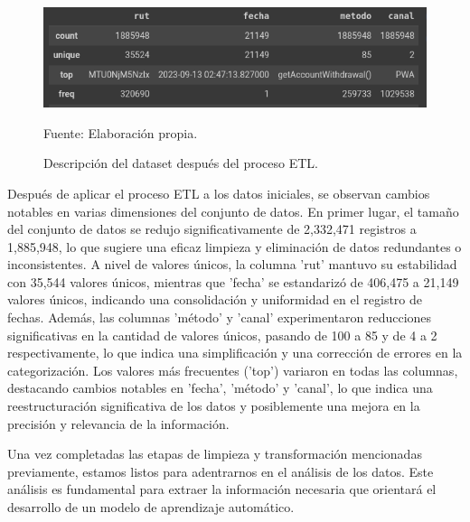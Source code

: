 \begin{figure}[H]
    \begin{minipage}[t]{0.8\textwidth}
        \caption{Descripción del dataset después del proceso ETL.}
        \label{describeFinal}        
    \end{minipage}

    \vspace{10pt}

    \centering
    \begin{minipage}[b]{0.9\textwidth}
        \centering
        \includegraphics[width=\textwidth]{img/describe_data_final.png}        
    \end{minipage}

    \begin{minipage}[t]{0.9\textwidth}
        Fuente: Elaboración propia.
    \end{minipage}
\end{figure}

Después de aplicar el proceso ETL a los datos iniciales, se observan cambios notables en varias dimensiones del conjunto de datos. En primer lugar, el tamaño del conjunto de datos se redujo significativamente de 2,332,471 registros a 1,885,948, lo que sugiere una eficaz limpieza y eliminación de datos redundantes o inconsistentes. A nivel de valores únicos, la columna 'rut' mantuvo su estabilidad con 35,544 valores únicos, mientras que 'fecha' se estandarizó de 406,475 a 21,149 valores únicos, indicando una consolidación y uniformidad en el registro de fechas. Además, las columnas 'método' y 'canal' experimentaron reducciones significativas en la cantidad de valores únicos, pasando de 100 a 85 y de 4 a 2 respectivamente, lo que indica una simplificación y  una corrección de errores en la categorización. Los valores más frecuentes ('top') variaron en todas las columnas, destacando cambios notables en 'fecha', 'método' y 'canal', lo que indica una reestructuración significativa de los datos y posiblemente una mejora en la precisión y relevancia de la información.

Una vez completadas las etapas de limpieza y transformación mencionadas previamente, estamos listos para adentrarnos en el análisis de los datos. Este análisis es fundamental para extraer la información necesaria que orientará el desarrollo de un modelo de aprendizaje automático.